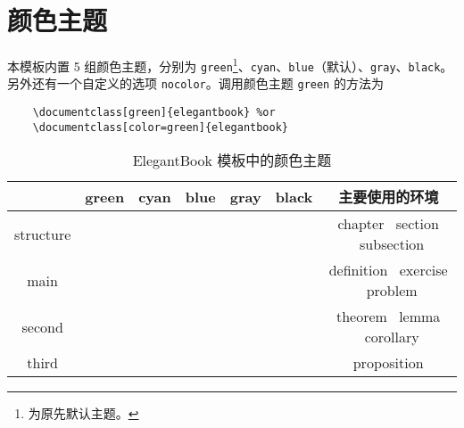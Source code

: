 	\section{颜色主题}
	本模板内置 5 组颜色主题，分别为 \textcolor{structure1}{\lstinline{green}}\footnote{为原先默认主题。}、\textcolor{structure2}{\lstinline{cyan}}、\textcolor{structure3}{\lstinline{blue}}（默认）、\textcolor{structure4}{\lstinline{gray}}、\textcolor{structure5}{\lstinline{black}}。另外还有一个自定义的选项  \lstinline{nocolor}。调用颜色主题 \lstinline{green} 的方法为 
	\begin{lstlisting}
	\documentclass[green]{elegantbook} %or
	\documentclass[color=green]{elegantbook}
	\end{lstlisting}
	
	\begin{table}[htbp]
	\caption{ElegantBook 模板中的颜色主题\label{tab:color thm}}
	\centering
	\begin{tabular}{ccccccc}
	\toprule
       & \textcolor{structure1}{green} 
       & \textcolor{structure2}{cyan} 
       & \textcolor{structure3}{blue}
       & \textcolor{structure4}{gray} 
       & \textcolor{structure5}{black} 
       & 主要使用的环境\\
	\midrule
	structure & \makecell{{\color{structure1}\rule{1cm}{1cm}}}
					& \makecell{{\color{structure2}\rule{1cm}{1cm}}}
					& \makecell{{\color{structure3}\rule{1cm}{1cm}}} 
					& \makecell{{\color{structure4}\rule{1cm}{1cm}}} 
					& \makecell{{\color{structure5}\rule{1cm}{1cm}}} 
					& chapter \ section \ subsection \\
	
	main      & \makecell{{\color{main1}\rule{1cm}{1cm}}}
					& \makecell{{\color{main2}\rule{1cm}{1cm}}}
					& \makecell{{\color{main3}\rule{1cm}{1cm}}}
					& \makecell{{\color{main4}\rule{1cm}{1cm}}}
					& \makecell{{\color{main5}\rule{1cm}{1cm}}}
					& definition \ exercise \ problem \\
	
	second    & \makecell{{\color{second1}\rule{1cm}{1cm}}}
					& \makecell{{\color{second2}\rule{1cm}{1cm}}}
					& \makecell{{\color{second3}\rule{1cm}{1cm}}}
					& \makecell{{\color{second4}\rule{1cm}{1cm}}}
					& \makecell{{\color{second5}\rule{1cm}{1cm}}}
					& theorem \ lemma \ corollary\\
	
	third     & \makecell{{\color{third1}\rule{1cm}{1cm}}}
					& \makecell{{\color{third2}\rule{1cm}{1cm}}}
					& \makecell{{\color{third3}\rule{1cm}{1cm}}}
					& \makecell{{\color{third4}\rule{1cm}{1cm}}}
					& \makecell{{\color{third5}\rule{1cm}{1cm}}}
					& proposition\\
	\bottomrule
	\end{tabular}
	\end{table}
	
